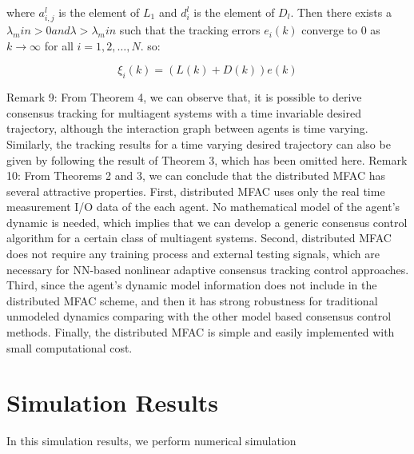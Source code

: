 \documentclass[journal,onecolumn]{IEEEtran}
\begin{document}
where \(a_{i,j}^l\) is the element of \(L_1\) and \(d_i^l\) is the element of \(D_l\). Then there exists a \(\lambda_min > 0 and \lambda > \lambda_min\) such that the tracking errors \(e_i(k)\) converge to 0 as \(k \rightarrow \infty\) for all \(i = 1,2,\dots, N\). so:

\[
    \xi_i(k)  = (L(k) + D(k))e(k)
\]

Remark 9: From Theorem 4, we can observe that, it is possible to derive consensus tracking for multiagent systems with
a time invariable desired trajectory, although the interaction
graph between agents is time varying. Similarly, the tracking
results for a time varying desired trajectory can also be given
by following the result of Theorem 3, which has been omitted
here.
Remark 10: From Theorems 2 and 3, we can conclude that
the distributed MFAC has several attractive properties. First,
distributed MFAC uses only the real time measurement I/O
data of the each agent. No mathematical model of the agent’s
dynamic is needed, which implies that we can develop a
generic consensus control algorithm for a certain class of multiagent systems. Second, distributed MFAC does not require
any training process and external testing signals, which are
necessary for NN-based nonlinear adaptive consensus tracking
control approaches. Third, since the agent’s dynamic model
information does not include in the distributed MFAC scheme,
and then it has strong robustness for traditional unmodeled
dynamics comparing with the other model based consensus
control methods. Finally, the distributed MFAC is simple and
easily implemented with small computational cost.

\section{Simulation Results}

In this simulation results, we perform numerical simulation

 
\end{document}
